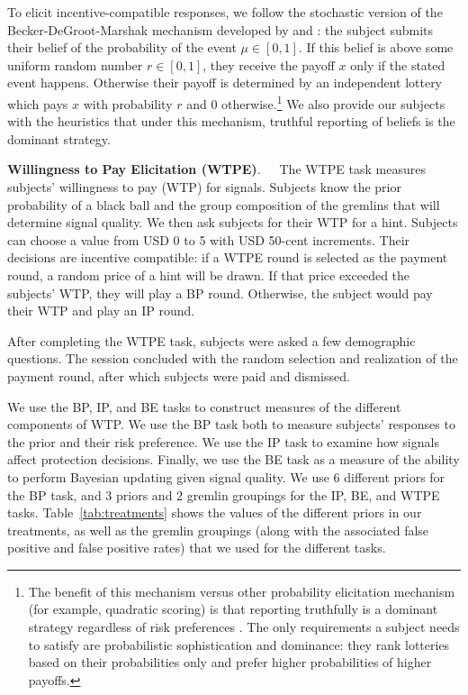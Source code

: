 \documentclass[12pt,a4paper]{article}
\begin{document}
To elicit incentive-compatible responses, we follow the stochastic version of the Becker-DeGroot-Marshak mechanism developed by \citet{grether_testing_1992} and \citet{holt_update_2009}: the subject submits their belief of the probability of the event $\mu \in [0,1]$. If this belief is above some uniform random number $r\in[0,1]$, they receive the payoff $x$ only if the stated event happens. Otherwise their payoff is determined by an independent lottery which pays $x$ with probability $r$ and 0 otherwise.\footnote{The benefit of this mechanism versus other probability elicitation mechanism (for example, quadratic scoring) is that reporting truthfully is a dominant strategy regardless of risk preferences \citep{karni_mechanism_2009-1}. The only requirements a subject needs to satisfy are probabilistic sophistication and dominance: they rank lotteries based on their probabilities only and prefer higher probabilities of higher payoffs.} We also provide our subjects with the heuristics that under this mechanism, truthful reporting of beliefs is the dominant strategy.

\bigskip
\noindent\textbf{Willingness to Pay Elicitation (WTPE)}.\ \ \ The WTPE task measures subjects' willingness to pay (WTP) for signals. Subjects know the prior probability of a black ball and the group composition of the gremlins that will determine signal quality.  We then ask subjects for their WTP for a hint. Subjects can choose a value from USD 0 to 5 with USD 50-cent increments. Their decisions are incentive compatible: if a WTPE round is selected as the payment round, a random price of a hint will be drawn. If that price exceeded the subjects' WTP, they will play a BP round. Otherwise, the subject would pay their WTP and play an IP round.  

\vspace{10pt} 

After completing the WTPE task, subjects were asked a few demographic questions. The session concluded with the random selection and realization of the payment round, after which subjects were paid and dismissed.

We use the BP, IP, and BE tasks to construct measures of the different components of WTP. We use the BP task both to measure subjects' responses to the prior and their risk preference. We use the IP task to examine how signals affect protection decisions. Finally, we use the BE task as a measure of the ability to perform Bayesian updating given signal quality. We use 6 different priors for the BP task, and 3 priors and 2 gremlin groupings for the IP, BE, and WTPE tasks. Table~\ref{tab:treatments} shows the values of the different priors in our treatments, as well as the gremlin groupings (along with the associated false positive and false positive rates) that we used for the different tasks.
\end{document}
